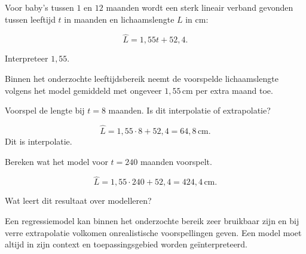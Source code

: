 \documentclass{ximera}
\begin{document}
\begin{oefening}{\oefU \ESS}

Voor baby's tussen $1$ en $12$ maanden wordt een sterk lineair verband
gevonden tussen leeftijd $t$ in maanden en lichaamslengte $L$ in cm:

\[
\hat L=1{,}55t+52{,}4.
\]

\begin{question}
Interpreteer $1{,}55$.

\begin{oplossing}
Binnen het onderzochte leeftijdsbereik neemt de voorspelde
lichaamslengte volgens het model gemiddeld met ongeveer
$1{,}55\,\mathrm{cm}$ per extra maand toe.
\end{oplossing}
\end{question}

\begin{question}
Voorspel de lengte bij $t=8$ maanden. Is dit interpolatie of
extrapolatie?

\begin{oplossing}
\[
\hat L=1{,}55\cdot8+52{,}4=64{,}8\,\mathrm{cm}.
\]
Dit is interpolatie.
\end{oplossing}
\end{question}

\begin{question}
Bereken wat het model voor $t=240$ maanden voorspelt.

\begin{oplossing}
\[
\hat L=1{,}55\cdot240+52{,}4=424{,}4\,\mathrm{cm}.
\]
\end{oplossing}
\end{question}

\begin{question}
Wat leert dit resultaat over modelleren?

\begin{oplossing}
Een regressiemodel kan binnen het onderzochte bereik zeer bruikbaar
zijn en bij verre extrapolatie volkomen onrealistische voorspellingen
geven. Een model moet altijd in zijn context en toepassingsgebied
worden geïnterpreteerd.
\end{oplossing}
\end{question}
\end{oefening}
\end{document}
